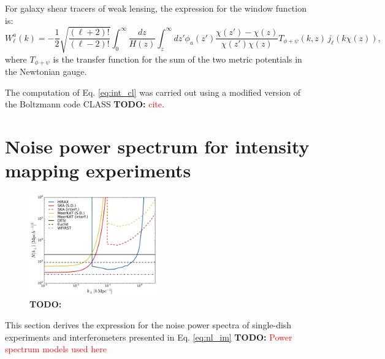 \documentclass[prd,twocolumn]{revtex4}
\newcommand{\TODO}[1]{{\bf TODO:} \textcolor{red}{#1}}
\begin{document}
\begin{widetext}
    For galaxy shear tracers of weak lensing, the expression for the window function
    is:
    \begin{equation}
      W^a_\ell(k)=-\frac{1}{2}\sqrt{\frac{(\ell+2)!}{(\ell-2)!}}\int_0^\infty
      \frac{dz}{H(z)}\int_z^\infty dz'\phi_a(z')\frac{\chi(z')-\chi(z)}{\chi(z')\chi(z)}
      T_{\phi+\psi}(k,z)\,j_\ell(k\chi(z)),
    \end{equation}
    where $T_{\phi+\psi}$ is the transfer function for the sum of the two metric
    potentials in the Newtonian gauge.
    
    The computation of Eq. \ref{eq:int_cl} was carried out using a modified version of
    the Boltzmann code CLASS \TODO{cite}.
    
  \section{Noise power spectrum for intensity mapping experiments}\label{app:noise_im}
    \begin{figure}
      \centering
      \includegraphics[width=0.49\textwidth]{nk}
      \caption{\TODO{}}
      \label{fig:nk}
    \end{figure}
    This section derives the expression for the noise power spectra of single-dish
    experiments and interferometers presented in Eq. \ref{eq:nl_im}
    \TODO{
      Power spectrum models used here
    }
  

\end{widetext}
\end{document}
